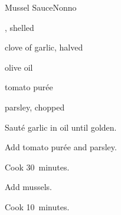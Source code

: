 \begin{recipe}{Mussel Sauce}{Nonno}{}

\begin{ingredients}
\item {}, shelled
\item clove of garlic, halved
\item olive oil
\item tomato purée
\item parsley, chopped
\end{ingredients}

\begin{directions}
\item Sauté garlic in oil until golden.
\item Add tomato purée and parsley.
\item Cook 30~minutes.
\item Add mussels.
\item Cook 10~minutes.
\end{directions}

\end{recipe}
